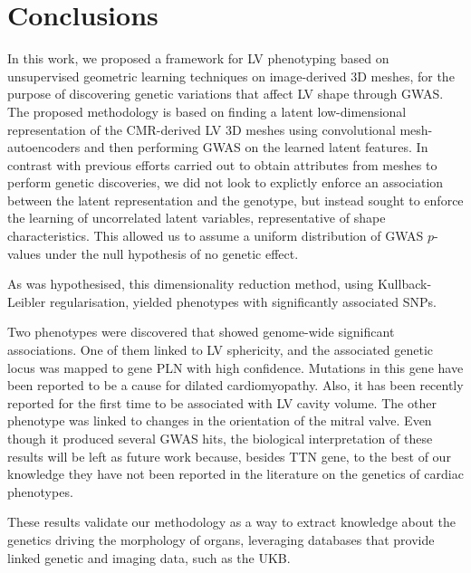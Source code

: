 \section*{Conclusions}
In this work, we proposed a framework for LV phenotyping based on unsupervised geometric learning techniques on image-derived 3D meshes, for the purpose of discovering genetic variations that affect LV shape through GWAS. The proposed methodology is based on finding a latent low-dimensional representation of the CMR-derived LV 3D meshes using convolutional mesh-autoencoders and then performing GWAS on the learned latent features. In contrast with previous efforts carried out to obtain attributes from meshes to perform genetic discoveries, we did not look to explictly enforce an association between the latent representation and the genotype, but instead sought to enforce the learning of uncorrelated latent variables, representative of shape characteristics. This allowed us to assume a uniform distribution of GWAS $p$-values under the null hypothesis of no genetic effect.

As was hypothesised, this dimensionality reduction method, using Kullback-Leibler regularisation, yielded phenotypes with significantly associated SNPs. 


Two phenotypes were discovered that showed genome-wide significant associations. One of them linked to LV sphericity, and the associated genetic locus was mapped to gene PLN with high confidence. Mutations in this gene have been reported to be a cause for dilated cardiomyopathy. Also, it has been recently reported for the first time to be associated with LV cavity volume. 
The other phenotype was linked to changes in the orientation of the mitral valve.
Even though it produced several GWAS hits, the biological interpretation of these results will be left as future work because, besides TTN gene, to the best of our knowledge they have not been reported in the literature on the genetics of cardiac phenotypes. 

These results validate our methodology as a way to extract knowledge about the genetics driving the morphology of organs, leveraging databases that provide linked genetic and imaging data, such as the UKB.
